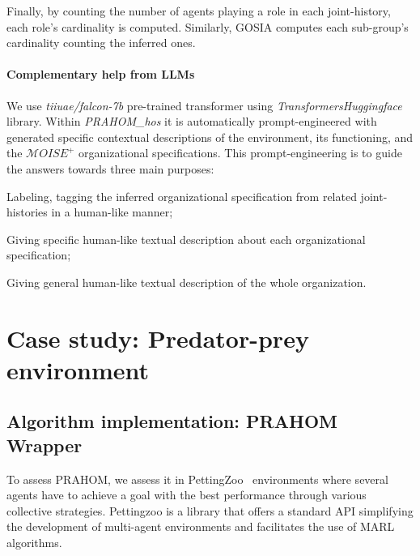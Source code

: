 \documentclass[runningheads]{llncs}
\begin{document}
Finally, by counting the number of agents playing a role in each joint-history, each role's cardinality is computed. Similarly, GOSIA computes each sub-group's cardinality counting the inferred ones.



%     


\paragraph{Complementary help from LLMs}

We use \emph{tiiuae/falcon-7b} pre-trained transformer using \emph{Transformers}\emph{Huggingface} library. Within \emph{PRAHOM\_hos} it is automatically prompt-engineered with generated specific contextual descriptions of the environment, its functioning, and the $\mathcal{M}OISE^+$ organizational specifications. This prompt-engineering is to guide the answers towards three main purposes:
\begin{enumerate*}[label=\roman*),itemjoin={;\quad}]
    \item Labeling, tagging the inferred organizational specification from related joint-histories in a human-like manner;
    \item Giving specific human-like textual description about each organizational specification;
    \item Giving general human-like textual description of the whole organization.
\end{enumerate*}



\section{Case study: Predator-prey environment}

\subsection{Algorithm implementation: PRAHOM Wrapper}


To assess PRAHOM, we assess it in PettingZoo~\cite{Terry2021} environments where several agents have to achieve a goal with the best performance through various collective strategies. Pettingzoo is a library that offers a standard API simplifying the development of multi-agent environments and facilitates the use of MARL algorithms.
\end{document}
